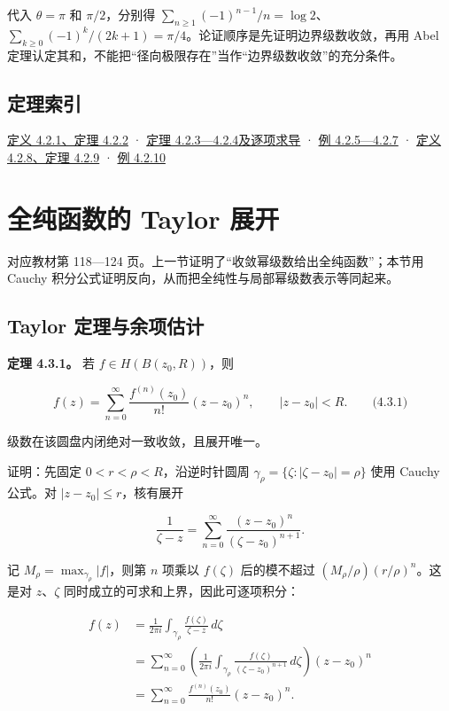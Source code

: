 \documentclass[11pt,a4paper]{article}
\begin{document}
代入 \(\theta=\pi\) 和 \(\pi/2\)，分别得
\(\sum_{n\ge1}(-1)^{n-1}/n=\log2\)、\(\sum_{k\ge0}(-1)^k/(2k+1)=\pi/4\)。论证顺序是先证明边界级数收敛，再用
Abel
定理认定其和，不能把``径向极限存在''当作``边界级数收敛''的充分条件。

\subsection{定理索引}\label{ch04-s2-heading-6}

\hyperref[ch04-s2-heading-1]{定义 4.2.1、定理 4.2.2} · \hyperref[ch04-s2-heading-2]{定理
4.2.3---4.2.4及逐项求导} · \hyperref[ch04-s2-heading-3]{例 4.2.5---4.2.7} ·
\hyperref[ch04-s2-heading-4]{定义 4.2.8、定理 4.2.9} · \hyperref[ch04-s2-heading-5]{例
4.2.10}

\section{全纯函数的 Taylor 展开}
对应教材第 118---124 页。上一节证明了``收敛幂级数给出全纯函数''；本节用
Cauchy 积分公式证明反向，从而把全纯性与局部幂级数表示等同起来。

\subsection{Taylor 定理与余项估计}\label{ch04-s3-heading-1}

\textbf{定理 4.3.1。} 若 \(f\in H(B(z_0,R))\)，则

\[
f(z)=\sum_{n=0}^{\infty}\frac{f^{(n)}(z_0)}{n!}(z-z_0)^n,
\qquad |z-z_0|<R.
\qquad\text{(4.3.1)}
\]

级数在该圆盘内闭绝对一致收敛，且展开唯一。

证明：先固定 \(0<r<\rho<R\)，沿逆时针圆周
\(\gamma_\rho=\{\zeta:|\zeta-z_0|=\rho\}\) 使用 Cauchy 公式。对
\(|z-z_0|\le r\)，核有展开

\[
\frac1{\zeta-z}
=\sum_{n=0}^{\infty}\frac{(z-z_0)^n}{(\zeta-z_0)^{n+1}}.
\]

记 \(M_\rho=\max_{\gamma_\rho}|f|\)，则第 \(n\) 项乘以 \(f(\zeta)\)
后的模不超过 \((M_\rho/\rho)(r/\rho)^n\)。这是对 \(z\)、\(\zeta\)
同时成立的可求和上界，因此可逐项积分：

\[
\begin{aligned}
f(z)&=\frac1{2\pi i}\int_{\gamma_\rho}\frac{f(\zeta)}{\zeta-z}\,d\zeta\\
&=\sum_{n=0}^{\infty}\left(\frac1{2\pi i}\int_{\gamma_\rho}
\frac{f(\zeta)}{(\zeta-z_0)^{n+1}}\,d\zeta\right)(z-z_0)^n\\
&=\sum_{n=0}^{\infty}\frac{f^{(n)}(z_0)}{n!}(z-z_0)^n.
\end{aligned}
\]
\end{document}
